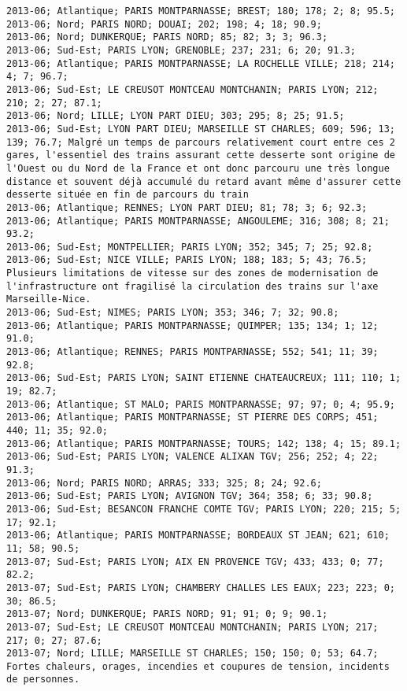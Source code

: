 \documentclass{article}
\begin{document}
\begin{Verbatim}[commandchars=\\\{\}]
2013-06; Atlantique; PARIS MONTPARNASSE; BREST; 180; 178; 2; 8; 95.5; 
2013-06; Nord; PARIS NORD; DOUAI; 202; 198; 4; 18; 90.9; 
2013-06; Nord; DUNKERQUE; PARIS NORD; 85; 82; 3; 3; 96.3; 
2013-06; Sud-Est; PARIS LYON; GRENOBLE; 237; 231; 6; 20; 91.3; 
2013-06; Atlantique; PARIS MONTPARNASSE; LA ROCHELLE VILLE; 218; 214; 4; 7; 96.7; 
2013-06; Sud-Est; LE CREUSOT MONTCEAU MONTCHANIN; PARIS LYON; 212; 210; 2; 27; 87.1; 
2013-06; Nord; LILLE; LYON PART DIEU; 303; 295; 8; 25; 91.5; 
2013-06; Sud-Est; LYON PART DIEU; MARSEILLE ST CHARLES; 609; 596; 13; 139; 76.7; Malgré un temps de parcours relativement court entre ces 2 gares, l'essentiel des trains assurant cette desserte sont origine de l'Ouest ou du Nord de la France et ont donc parcouru une très longue distance et souvent déjà accumulé du retard avant même d'assurer cette desserte située en fin de parcours du train
2013-06; Atlantique; RENNES; LYON PART DIEU; 81; 78; 3; 6; 92.3; 
2013-06; Atlantique; PARIS MONTPARNASSE; ANGOULEME; 316; 308; 8; 21; 93.2; 
2013-06; Sud-Est; MONTPELLIER; PARIS LYON; 352; 345; 7; 25; 92.8; 
2013-06; Sud-Est; NICE VILLE; PARIS LYON; 188; 183; 5; 43; 76.5; Plusieurs limitations de vitesse sur des zones de modernisation de l'infrastructure ont fragilisé la circulation des trains sur l'axe Marseille-Nice.
2013-06; Sud-Est; NIMES; PARIS LYON; 353; 346; 7; 32; 90.8; 
2013-06; Atlantique; PARIS MONTPARNASSE; QUIMPER; 135; 134; 1; 12; 91.0; 
2013-06; Atlantique; RENNES; PARIS MONTPARNASSE; 552; 541; 11; 39; 92.8; 
2013-06; Sud-Est; PARIS LYON; SAINT ETIENNE CHATEAUCREUX; 111; 110; 1; 19; 82.7; 
2013-06; Atlantique; ST MALO; PARIS MONTPARNASSE; 97; 97; 0; 4; 95.9; 
2013-06; Atlantique; PARIS MONTPARNASSE; ST PIERRE DES CORPS; 451; 440; 11; 35; 92.0; 
2013-06; Atlantique; PARIS MONTPARNASSE; TOURS; 142; 138; 4; 15; 89.1; 
2013-06; Sud-Est; PARIS LYON; VALENCE ALIXAN TGV; 256; 252; 4; 22; 91.3; 
2013-06; Nord; PARIS NORD; ARRAS; 333; 325; 8; 24; 92.6; 
2013-06; Sud-Est; PARIS LYON; AVIGNON TGV; 364; 358; 6; 33; 90.8; 
2013-06; Sud-Est; BESANCON FRANCHE COMTE TGV; PARIS LYON; 220; 215; 5; 17; 92.1; 
2013-06; Atlantique; PARIS MONTPARNASSE; BORDEAUX ST JEAN; 621; 610; 11; 58; 90.5; 
2013-07; Sud-Est; PARIS LYON; AIX EN PROVENCE TGV; 433; 433; 0; 77; 82.2; 
2013-07; Sud-Est; PARIS LYON; CHAMBERY CHALLES LES EAUX; 223; 223; 0; 30; 86.5; 
2013-07; Nord; DUNKERQUE; PARIS NORD; 91; 91; 0; 9; 90.1; 
2013-07; Sud-Est; LE CREUSOT MONTCEAU MONTCHANIN; PARIS LYON; 217; 217; 0; 27; 87.6; 
2013-07; Nord; LILLE; MARSEILLE ST CHARLES; 150; 150; 0; 53; 64.7; Fortes chaleurs, orages, incendies et coupures de tension, incidents de personnes.

\end{Verbatim}
\end{document}

